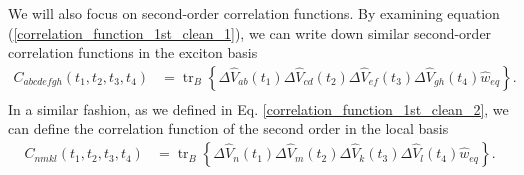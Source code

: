 We will also focus on second-order correlation functions. By examining equation (\ref{correlation_function_1st_clean_1}), we can write down similar second-order correlation functions in the exciton basis
\begin{equation}
\label{correlation_function_2nd_clean_1}
    \begin{aligned}
    C_{abcdefgh}(t_1, t_2, t_3, t_4) &= \operatorname{tr}_B \left\{ \Delta\hat{V}_{ab}(t_1) \Delta\hat{V}_{cd}(t_2) \Delta\hat{V}_{ef}(t_3) \Delta\hat{V}_{gh}(t_4) \hat{w}_{eq}\right\}. \\
    \end{aligned}
\end{equation}
In a similar fashion, as we defined in Eq. \ref{correlation_function_1st_clean_2}, we can define the correlation function of the second order in the local basis
\begin{equation}
\label{correlation_function_2nd_clean_2}
    \begin{aligned}
    C_{nmkl}(t_1, t_2, t_3, t_4) &= \operatorname{tr}_B \left\{ \Delta\hat{V}_{n}(t_1) \Delta\hat{V}_{m}(t_2) \Delta\hat{V}_{k}(t_3) \Delta\hat{V}_{l}(t_4) \hat{w}_{eq}\right\}. \\
    \end{aligned}
\end{equation}

